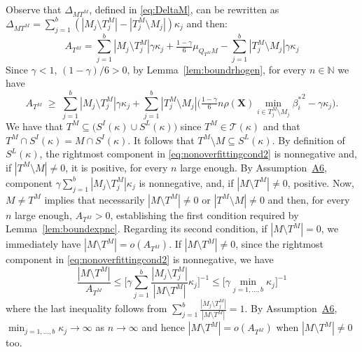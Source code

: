 \documentclass[bj,authoryear]{imsart}
\theoremstyle{plain}
\newcommand{\N}{\mathbb{N}}
\newcommand{\T}{\mathcal{T}}
\newcommand{\bs}{\boldsymbol}
\begin{document}
Observe that $\Delta_{MT^M}$, defined in \eqref{eq:DeltaM}, can be rewritten as $\Delta_{MT^M}=\sum_{j=1}^b(|M_j\setminus T^M_j|-|T^M_j\setminus M_j|)\kappa_j$ and then:
$$ A_{T^M}=\sum_{j=1}^b|M_j\setminus T^M_j|\gamma\kappa_j+\tfrac{1-\gamma}{6}\mu_{Q_{T^M}M}-\sum_{j=1}^b|T^M_j\setminus M_j|\gamma\kappa_j $$
Since $\gamma <1$, $(1-\gamma)/6 >0$, by  Lemma~\ref{lem:boundrhogen}, for every $n\in \N$ we have 
\begin{equation}\label{eq:nonoverfittingcond2}
   A_{T^M}\;\geq\; \sum_{j=1}^b|M_j \setminus T^M_j|\gamma\kappa_j + \sum_{j=1}^b |T^M_j\setminus M_j |\Big(\tfrac{1-\gamma}{6} n \rho(\bs X) \min_{i\in T^M_j\setminus M_j}{\beta^*_i}^{2} - \gamma\kappa_j\Big).
\end{equation} 
We have that $T^M\subseteq \big(S^I(\kappa) \cup S^L(\kappa)\big)$ since $T^M\in\T(\kappa)$ and that $T^M\cap S^{I}(\kappa) = M\cap S^{I}(\kappa)$. It follows that $T^M\setminus M \subseteq S^L(\kappa)$. By definition of $S^L(\kappa)$, the rightmost component in \eqref{eq:nonoverfittingcond2} is nonnegative and, if $|T^M\setminus M|\neq0$, it is positive, for every $n$ large enough. By Assumption~\hyperlink{lab:A6}{A6}, component $\gamma\sum_{j=1}^b|M_j \setminus T^M_j|\kappa_j$ is nonnegative, and, if $|M\setminus T^M|\neq0$, positive. Now, $M\neq T^M$ implies that necessarily $|M\setminus T^M|\neq0$ or $|T^M\setminus M|\neq0$ and then, for every $n$ large enough, $A_{T^M}>0$, establishing the first condition required by Lemma~\ref{lem:boundexpnc}. Regarding its second condition, if $|M\setminus T^M|=0$, we immediately have $|M\setminus T^M|=o(A_{T^M})$. If $|M\setminus T^M|\neq 0$, since the rightmost component in \eqref{eq:nonoverfittingcond2} is nonnegative, we have
$$\frac{|M\setminus T^M|}{A_{T^M}}\leq \bigg[ \gamma\sum_{j=1}^b\frac{|M_j \setminus T^M_j|}{|M\setminus T^M|}\kappa_j \bigg]^{-1} \leq \bigg[ \gamma\min_{j=1,\ldots,b}\kappa_j \bigg]^{-1} $$
where the last inequality follows from $\sum_{j=1}^b\frac{|M_j \setminus T^M_j|}{|M\setminus T^M|}=1$. By Assumption~\hyperlink{lab:A6}{A6}, $\min_{j=1,\ldots,b}\kappa_j\to \infty$ as $n\to\infty$ and hence $|M\setminus T^M|=o(A_{T^M})$ when $|M\setminus T^M|\neq 0$ too.
\end{document}
